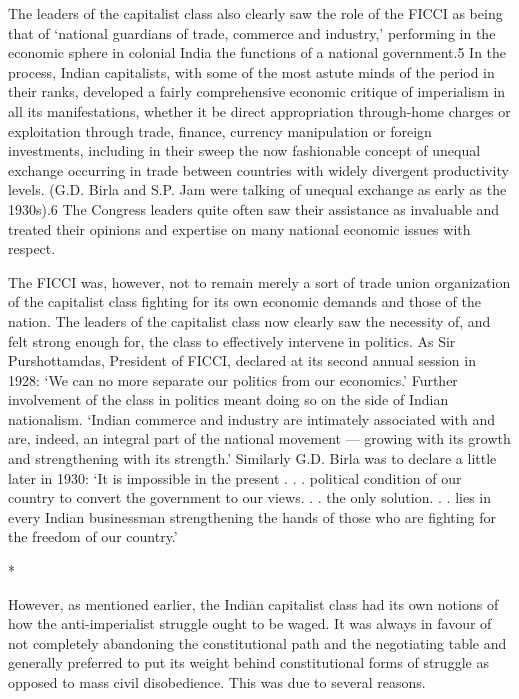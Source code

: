 The leaders of the capitalist class also clearly saw the role of the FICCI as being that of ‘national guardians of trade, commerce and industry,’ performing in the economic sphere in colonial India the functions of a national government.5 In the process, Indian capitalists, with some of the most astute minds of the period in their ranks, developed a fairly comprehensive economic critique of imperialism in all its manifestations, whether it be direct appropriation through-home charges or exploitation through trade, finance, currency manipulation or foreign investments, including in their sweep the now fashionable concept of unequal exchange occurring in trade between countries with widely divergent productivity levels. (G.D. Birla and S.P. Jam were talking of unequal exchange as early as the 1930s).6 The Congress leaders quite often saw their assistance as invaluable and treated their opinions and expertise on many national economic issues with respect. 

The FICCI was, however, not to remain merely a sort of trade union organization of the capitalist class fighting for its own economic demands and those of the nation. The leaders of the capitalist class now clearly saw the necessity of, and felt strong enough for, the class to effectively intervene in politics. As Sir Purshottamdas, President of FICCI, declared at its second annual session in 1928: ‘We can no more separate our politics from our economics.’ Further involvement of the class in politics meant doing so on the side of Indian nationalism. ‘Indian commerce and industry are intimately associated with and are, indeed, an integral part of the national movement — growing with its growth and strengthening with its strength.’ Similarly G.D. Birla was to declare a little later in 1930: ‘It is impossible in the present . . . political condition of our country to convert the government to our views. . . the only solution. . . lies in every Indian businessman strengthening the hands of those who are fighting for the freedom of our country.’

\begin{center}*\end{center}



However, as mentioned earlier, the Indian capitalist class had its own notions of how the anti-imperialist struggle ought to be waged. It was always in favour of not completely abandoning the constitutional path and the negotiating table and generally preferred to put its weight behind constitutional forms of struggle as opposed to mass civil disobedience. This was due to several reasons. 

